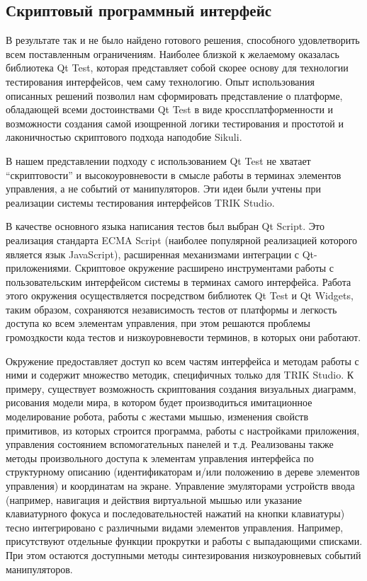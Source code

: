 \documentclass[conference]{IEEEtran}
\begin{document}
\subsection{Скриптовый программный интерфейс}
В результате так и не было найдено готового решения, способного удовлетворить всем 
поставленным ограничениям. Наиболее близкой к желаемому оказалась библиотека Qt Test, 
которая представляет собой скорее основу для технологии тестирования интерфейсов, чем 
саму технологию. Опыт использования описанных решений позволил нам сформировать представление 
о платформе, обладающей всеми достоинствами Qt Test в виде кроссплатформенности и 
возможности создания самой изощренной логики тестирования и простотой и лаконичностью 
скриптового подхода наподобие Sikuli.

В нашем представлении подходу с использованием Qt Test не хватает "`скриптовости"' и 
высокоуровневости в смысле работы в терминах элементов управления, а не событий от 
манипуляторов. Эти идеи были учтены при реализации системы тестирования интерфейсов TRIK Studio.

В качестве основного языка написания тестов был выбран Qt Script. Это реализация стандарта 
ECMA Script (наиболее популярной реализацией которого является язык JavaScript), расширенная 
механизмами интеграции с Qt-приложениями. Скриптовое окружение расширено инструментами 
работы с пользовательским интерфейсом системы в терминах самого интерфейса. Работа 
этого окружения осуществляется посредством библиотек Qt Test и Qt Widgets, таким образом, 
сохраняются независимость тестов от платформы и легкость доступа ко всем элементам 
управления, при этом решаются проблемы громоздкости кода тестов и низкоуровневости 
терминов, в которых они работают.

Окружение предоставляет доступ ко всем частям интерфейса и методам работы с ними и 
содержит множество методик, специфичных только для TRIK Studio. К примеру, существует 
возможность скриптования создания визуальных диаграмм, рисования модели мира, в котором 
будет производиться имитационное моделирование робота, работы с жестами мышью, изменения 
свойств примитивов, из которых строится программа, работы с настройками приложения, 
управления состоянием вспомогательных панелей и т.д. Реализованы также методы произвольного 
доступа к элементам управления интерфейса по структурному описанию (идентификаторам 
и/или положению в дереве элементов управления) и координатам на экране. Управление 
эмуляторами устройств ввода (например, навигация и действия виртуальной мышью или 
указание клавиатурного фокуса и последовательностей нажатий на кнопки клавиатуры) тесно 
интегрировано с различными видами элементов управления. Например, присутствуют отдельные 
функции прокрутки и работы с выпадающими списками. При этом остаются доступными методы 
синтезирования низкоуровневых событий манипуляторов. 
\end{document}
